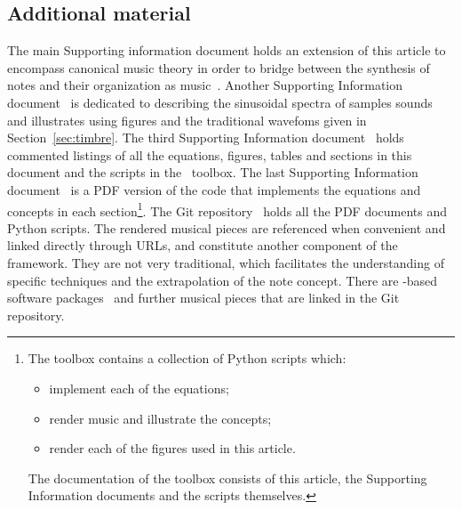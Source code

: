 \subsection{Additional material}
The main Supporting information document holds an extension of this article to encompass canonical music theory in order to bridge between the synthesis of notes and their organization as music~\cite{massNotesInMusic}.
Another Supporting Information document~\cite{massSampled} is dedicated to describing the sinusoidal spectra of samples sounds and illustrates using figures and the traditional wavefoms given in Section~\ref{sec:timbre}.
The third Supporting Information document~\cite{massListings}
holds commented listings of all the equations, figures, tables and sections in this document
and the scripts in the \massa\ toolbox.
The last Supporting Information document~\cite{massCode} is a PDF version of
the code that implements the equations and concepts in each section\footnote{
	The toolbox contains a collection of Python scripts which:
\begin{itemize}
    \item implement each of the equations;
    \item render music and illustrate the concepts;
    \item render each of the figures used in this article.
\end{itemize}
The documentation of the toolbox consists of this article, the Supporting Information documents and the scripts themselves.}.
The Git repository~\cite{MASSA} holds all the PDF documents and Python scripts.
The rendered musical pieces are referenced when convenient and linked directly through URLs,
and constitute another component of the framework.
They are not very traditional, which facilitates the understanding of specific techniques
and the extrapolation of the note concept.
There are \mass -based software packages~\cite{music,figgus} and
further musical pieces that are linked in the Git repository.


